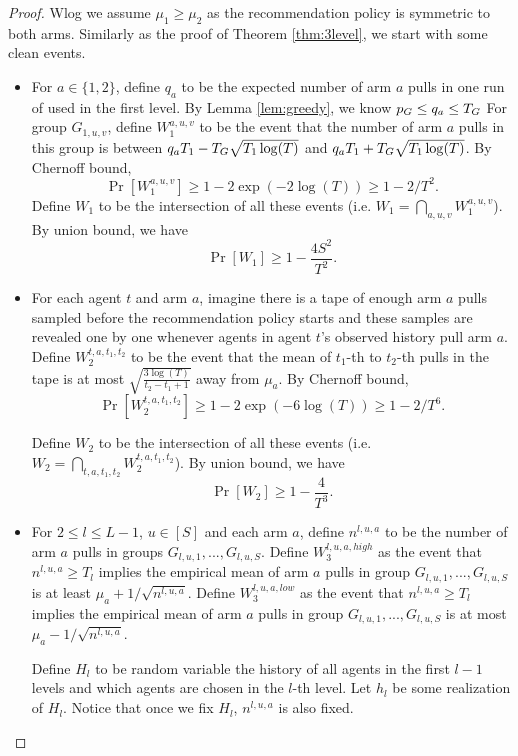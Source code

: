 \begin{proof}
Wlog we assume $\mu_1 \geq \mu_2$ as the recommendation policy is symmetric to both arms. Similarly as the proof of Theorem \ref{thm:3level}, we start with some clean events.

\begin{itemize}
\item For $a \in \{1,2\}$, define $q_a$ to be the expected number of arm $a$ pulls in one run of \ALGG used in the first level. By Lemma \ref{lem:greedy}, we know $p_G \leq q_a \leq T_G$ For group $G_{1,u,v}$, define $W_1^{a,u,v}$ to be the event that the number of arm $a$ pulls in this group is between $q_a T_1- T_G \sqrt{T_1\log(T)}$ and $q_a T_1 + T_G \sqrt{T_1\log(T)}$. By Chernoff bound,
\[
\Pr[W_1^{a,u,v}] \geq 1-2\exp(-2\log(T)) \geq 1-2/T^2.
\]
Define $W_1$ to be the intersection of all these events (i.e. $W_1 = \bigcap_{a,u,v}W_1^{a,u,v}$). By union bound, we have
\[
\Pr[W_1] \geq 1- \frac{4S^2}{T^2}.
\]


\item For each agent $t$ and arm $a$, imagine there is a tape of enough arm $a$ pulls sampled before the recommendation policy starts and these samples are revealed one by one whenever agents in agent $t$'s observed history pull arm $a$.  Define $W_2^{t,a,t_1,t_2}$ to be the event that the mean of $t_1$-th to $t_2$-th pulls in the tape is at most $\sqrt{\frac{3\log(T)}{t_2-t_1+1}}$ away from $\mu_a$. By Chernoff bound, 
\[
\Pr[W_2^{t,a,t_1,t_2}] \geq 1 - 2\exp(-6\log(T)) \geq 1- 2/T^6.
\]

Define $W_2$ to be the intersection of all these events (i.e. $W_2 = \bigcap_{t,a,t_1,t_2} W_2^{t,a,t_1,t_2}$). By union bound, we have
\[
\Pr[W_2] \geq 1- \frac{4}{T^3}.
\]


\item For $2\leq l \leq L-1$, $u\in [S]$ and each arm $a$, define $n^{l,u,a}$ to be the number of arm $a$ pulls in groups $G_{l,u,1},...,G_{l,u,S}$. Define $W_3^{l,u,a,high}$ as the event that $n^{l,u,a} \geq T_l$ implies the empirical mean of arm $a$ pulls in group $G_{l,u,1},...,G_{l,u,S}$ is at least $\mu_a + 1/\sqrt{n^{l,u,a}}$. Define $W_3^{l,u,a,low}$ as the event that $n^{l,u,a} \geq T_l$ implies the empirical mean of arm $a$ pulls in group $G_{l,u,1},...,G_{l,u,S}$ is at most $\mu_a - 1/\sqrt{n^{l,u,a}}$.

Define $H_l$ to be random variable the history of all agents in the first $l-1$ levels and which agents are chosen in the $l$-th level. Let $h_l$ be some realization of $H_l$. Notice that once we fix $H_l$, $n^{l,u,a}$ is also fixed. 


\end{itemize}
\end{proof}
